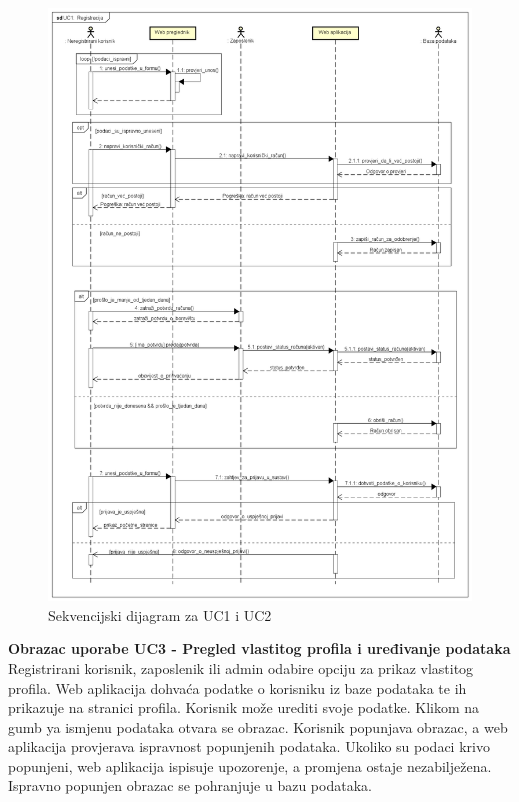 \begin{figure}[H]
	\includegraphics[width=.9\linewidth]{slike/UC1_Registracija.png}
	\centering
	\caption{Sekvencijski dijagram za UC1 i UC2}
	\label{fig:skvDReg}
\end{figure}
\eject

\textbf{Obrazac uporabe UC3 - Pregled vlastitog profila i uređivanje podataka}\\

{Registrirani korisnik, zaposlenik ili admin odabire opciju za prikaz vlastitog profila. Web aplikacija dohvaća podatke o korisniku iz baze podataka te ih prikazuje na stranici profila. Korisnik može urediti svoje podatke. Klikom na gumb ya ismjenu podataka otvara se obrazac. Korisnik popunjava obrazac, a web aplikacija provjerava ispravnost popunjenih podataka. Ukoliko su podaci krivo popunjeni, web aplikacija ispisuje upozorenje, a promjena ostaje nezabilježena. Ispravno popunjen obrazac se pohranjuje u bazu podataka. }


